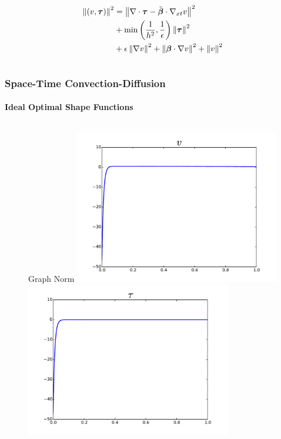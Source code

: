 \documentclass[18pt,xcolor=table]{beamer}
\begin{document}
\begin{frame}[t]
\begin{columns}[t]
\begin{column}{0.5\textwidth}
\begin{figure}[t]
\end{figure}
\vspace{-5ex}
\small{
\begin{align*}
\left\| (v,\boldsymbol\tau) \right\|^2&=
\left\| \nabla\cdot\boldsymbol\tau-\tilde{\boldsymbol\beta}\cdot\nabla_{xt} v \right\|^2\\
&+\min\left( \frac{1}{h^2},\frac{1}{\epsilon} \right)\left\| \boldsymbol\tau \right\|^2\\
&+\epsilon\left\| \nabla v \right\|^2
+\left\| \boldsymbol\beta\cdot\nabla v \right\|^2
+\left\| v \right\|^2
\end{align*}
}
\end{column}
\end{columns}
\end{frame}

\begin{frame}[t]
\frametitle{Space-Time Convection-Diffusion}
\framesubtitle{Ideal Optimal Shape Functions}
\vspace{-3ex}
\begin{columns}
\begin{column}{0.5\textwidth}
\begin{figure}[t]
\centering
Graph Norm
\includegraphics[width=0.8\textwidth]{OptimalTestFunctions/Graph_v}\\
\includegraphics[width=0.8\textwidth]{OptimalTestFunctions/Graph_tau}

\end{figure}
\end{column}
\end{columns}
\end{frame}
\end{document}
